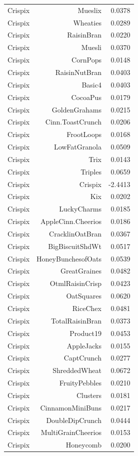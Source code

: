 \begin{longtable}{@{}lrr@{}}
Crispix & Mueslix & 0.0378 \\
Crispix & Wheaties & 0.0289 \\
Crispix & RaisinBran & 0.0220 \\
Crispix & Muesli & 0.0370 \\
Crispix & CornPops & 0.0148 \\
Crispix & RaisinNutBran & 0.0403 \\
Crispix & Basic4 & 0.0403 \\
Crispix & CocoaPus & 0.0179 \\
Crispix & GoldenGrahams & 0.0215 \\
Crispix & Cinn.ToastCrunch & 0.0206 \\
Crispix & FrootLoops & 0.0168 \\
Crispix & LowFatGranola & 0.0509 \\
Crispix & Trix & 0.0143 \\
Crispix & Triples & 0.0659 \\
Crispix & Crispix & -2.4413 \\
Crispix & Kix & 0.0202 \\
Crispix & LuckyCharms & 0.0185 \\
Crispix & AppleCinn.Cheerios & 0.0186 \\
Crispix & CracklinOatBran & 0.0367 \\
Crispix & BigBiscuitShdWt & 0.0517 \\
Crispix & HoneyBunchesofOats & 0.0539 \\
Crispix & GreatGraines & 0.0482 \\
Crispix & OtmlRaisinCrisp & 0.0423 \\
Crispix & OatSquares & 0.0620 \\
Crispix & RiceChex & 0.0481 \\
Crispix & TotalRaisinBran & 0.0373 \\
Crispix & Product19 & 0.0453 \\
Crispix & AppleJacks & 0.0155 \\
Crispix & CaptCrunch & 0.0277 \\
Crispix & ShreddedWheat & 0.0672 \\
Crispix & FruityPebbles & 0.0210 \\
Crispix & Clusters & 0.0181 \\
Crispix & CinnamonMiniBuns & 0.0217 \\
Crispix & DoubleDipCrunch & 0.0444 \\
Crispix & MultiGrainCheerios & 0.0153 \\
Crispix & Honeycomb & 0.0200 \\

\end{longtable}
